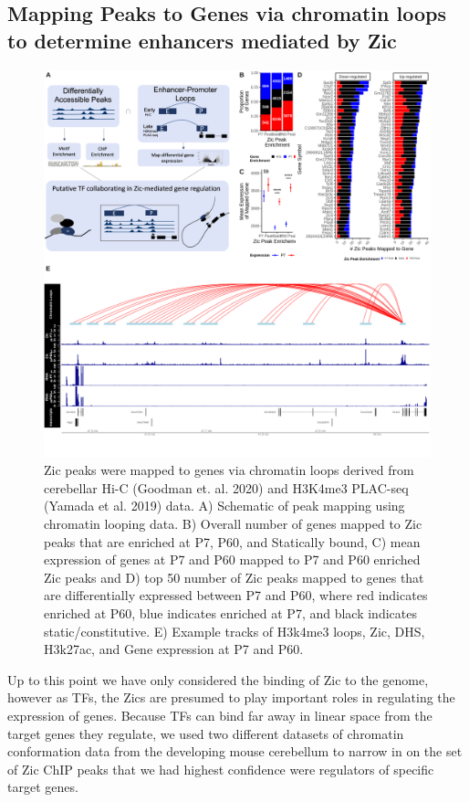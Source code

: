 \documentclass[fleqn,10pt]{wlscirep}
\begin{document}
\subsection*{Mapping Peaks to Genes via chromatin loops to determine enhancers mediated by Zic}

\begin{figure}[!ht]
\includegraphics[width=.95\textwidth]{../figures/figure3.png}
\caption{Zic peaks were mapped to genes via chromatin loops derived from cerebellar Hi-C (Goodman et. al. 2020)\cite{Goodman2020TheBrain} and H3K4me3 PLAC-seq (Yamada et al. 2019)\cite{Yamada2019SensoryLearning} data. A) Schematic of peak mapping using chromatin looping data. B) Overall number of genes mapped to Zic peaks that are enriched at P7, P60, and Statically bound, C) mean expression of genes at P7 and P60 mapped to P7 and P60 enriched Zic peaks and D) top 50 number of Zic peaks mapped to genes that are differentially expressed between P7 and P60, where red indicates enriched at P60, blue indicates enriched at P7, and black indicates static/constitutive. E) Example tracks of H3k4me3 loops, Zic, DHS, H3k27ac, and Gene expression at P7 and P60.}
\label{fig:PeakMapping}
\end{figure}

Up to this point we have only considered the binding of Zic to the genome, however as TFs, the Zics are presumed to play important roles in regulating the expression of genes. Because TFs can bind far away in linear space from the target genes they regulate, we used two different datasets of chromatin conformation data from the developing mouse cerebellum to narrow in on the set of Zic ChIP peaks that we had highest confidence were regulators of specific target genes. 
\end{document}
